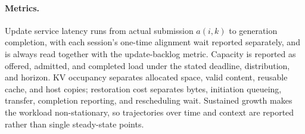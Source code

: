 \paragraph{Metrics.}
Update service latency runs from actual submission $a(i,k)$ to generation
completion, with each session's one-time alignment wait reported separately,
and is always read together with the update-backlog metric. Capacity is
reported as offered, admitted, and completed load under the stated deadline,
distribution, and horizon. KV occupancy separates allocated space, valid
content, reusable cache, and host copies; restoration cost separates bytes,
initiation queueing, transfer, completion reporting, and rescheduling wait.
Sustained growth makes the workload non-stationary, so trajectories over time
and context are reported rather than single steady-state points.
